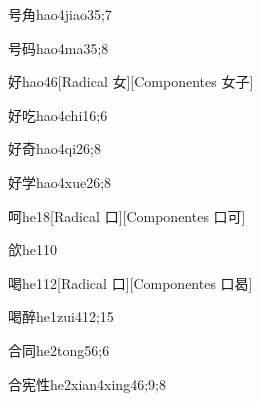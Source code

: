 \begin{verbete}{号角}{hao4jiao3}{5;7}
\end{verbete}

\begin{verbete}{号码}{hao4ma3}{5;8}
\end{verbete}

\begin{verbete}{好}{hao4}{6}[Radical ⼥][Componentes ⼥⼦]
\end{verbete}

\begin{verbete}{好吃}{hao4chi1}{6;6}
\end{verbete}

\begin{verbete}{好奇}{hao4qi2}{6;8}
\end{verbete}

\begin{verbete}{好学}{hao4xue2}{6;8}
\end{verbete}

\begin{verbete}{呵}{he1}{8}[Radical 口][Componentes 口可]
\end{verbete}

\begin{verbete}{欱}{he1}{10}
\end{verbete}

\begin{verbete}{喝}{he1}{12}[Radical 口][Componentes 口曷]
\end{verbete}

\begin{verbete}{喝醉}{he1zui4}{12;15}
\end{verbete}

\begin{verbete}{合同}{he2tong5}{6;6}
\end{verbete}

\begin{verbete}{合宪性}{he2xian4xing4}{6;9;8}
\end{verbete}

